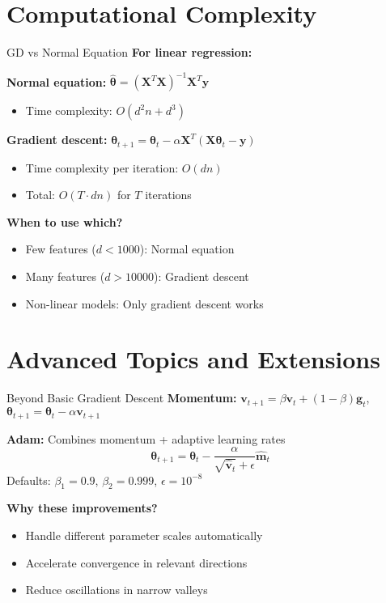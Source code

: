 \documentclass[aspectratio=169,11pt]{beamer}
\newcommand{\vtheta}{\bm{\theta}}
\newcommand{\vy}{\bm{y}}
\newcommand{\vg}{\bm{g}}
\newcommand{\vv}{\bm{v}}
\newcommand{\mX}{\bm{X}}
\begin{document}
\section{Computational Complexity}

\begin{frame}{GD vs Normal Equation}
\textbf{For linear regression:}

\textbf{Normal equation:} $\hat{\vtheta} = (\mX^T\mX)^{-1}\mX^T\vy$
\begin{itemize}
\item Time complexity: $O(d^2n + d^3)$
\end{itemize}

\pause
\textbf{Gradient descent:} $\vtheta_{t+1} = \vtheta_t - \alpha \mX^T(\mX\vtheta_t - \vy)$
\begin{itemize}
\item Time complexity per iteration: $O(dn)$
\item Total: $O(T \cdot dn)$ for $T$ iterations
\end{itemize}

\pause
\textbf{When to use which?}
\begin{itemize}
\item Few features ($d < 1000$): Normal equation
\item Many features ($d > 10000$): Gradient descent
\item Non-linear models: Only gradient descent works
\end{itemize}
\end{frame}

\section{Advanced Topics and Extensions}

\begin{frame}{Beyond Basic Gradient Descent}
\textbf{Momentum:} $\vv_{t+1} = \beta \vv_t + (1-\beta)\vg_t$, $\vtheta_{t+1} = \vtheta_t - \alpha \vv_{t+1}$

\textbf{Adam:} Combines momentum + adaptive learning rates
\[\vtheta_{t+1} = \vtheta_t - \frac{\alpha}{\sqrt{\hat{\vv}_t} + \epsilon} \hat{\mathbf{m}}_t\]
Defaults: $\beta_1=0.9$, $\beta_2=0.999$, $\epsilon=10^{-8}$

\pause
\textbf{Why these improvements?}
\begin{itemize}
\item Handle different parameter scales automatically
\item Accelerate convergence in relevant directions
\item Reduce oscillations in narrow valleys
\end{itemize}
\end{frame}
\end{document}
